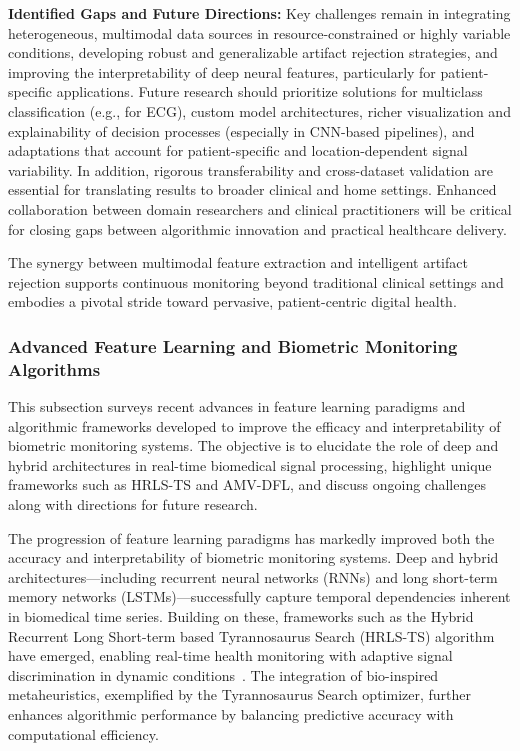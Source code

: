 \documentclass[sigconf]{acmart}
\begin{document}
\textbf{Identified Gaps and Future Directions:} Key challenges remain in integrating heterogeneous, multimodal data sources in resource-constrained or highly variable conditions, developing robust and generalizable artifact rejection strategies, and improving the interpretability of deep neural features, particularly for patient-specific applications. Future research should prioritize solutions for multiclass classification (e.g., for ECG), custom model architectures, richer visualization and explainability of decision processes (especially in CNN-based pipelines), and adaptations that account for patient-specific and location-dependent signal variability. In addition, rigorous transferability and cross-dataset validation are essential for translating results to broader clinical and home settings. Enhanced collaboration between domain researchers and clinical practitioners will be critical for closing gaps between algorithmic innovation and practical healthcare delivery.

The synergy between multimodal feature extraction and intelligent artifact rejection supports continuous monitoring beyond traditional clinical settings and embodies a pivotal stride toward pervasive, patient-centric digital health.

\subsubsection{Advanced Feature Learning and Biometric Monitoring Algorithms}

This subsection surveys recent advances in feature learning paradigms and algorithmic frameworks developed to improve the efficacy and interpretability of biometric monitoring systems. The objective is to elucidate the role of deep and hybrid architectures in real-time biomedical signal processing, highlight unique frameworks such as HRLS-TS and AMV-DFL, and discuss ongoing challenges along with directions for future research.

The progression of feature learning paradigms has markedly improved both the accuracy and interpretability of biometric monitoring systems. Deep and hybrid architectures—including recurrent neural networks (RNNs) and long short-term memory networks (LSTMs)—successfully capture temporal dependencies inherent in biomedical time series. Building on these, frameworks such as the Hybrid Recurrent Long Short-term based Tyrannosaurus Search (HRLS-TS) algorithm have emerged, enabling real-time health monitoring with adaptive signal discrimination in dynamic conditions~\cite{ref107}. The integration of bio-inspired metaheuristics, exemplified by the Tyrannosaurus Search optimizer, further enhances algorithmic performance by balancing predictive accuracy with computational efficiency.
\end{document}
